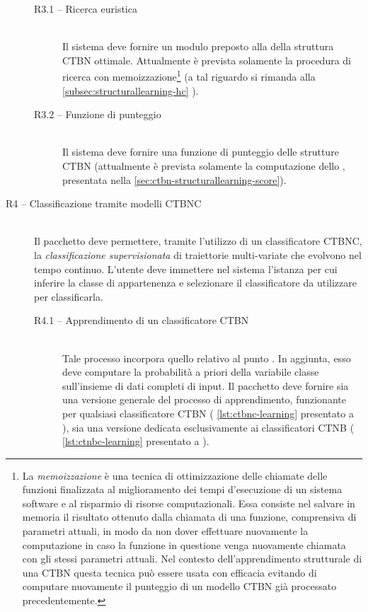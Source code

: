 \begin{description}
		\begin{description}
			\item[R3.1 -- Ricerca euristica] \hfill \\
			Il sistema deve fornire un modulo preposto alla  della struttura \acs{CTBN} ottimale. Attualmente è prevista solamente la procedura di ricerca \emph{\keyword{\hc{}}} con memoizzazione\footnote{La \emph{memoizzazione} è una tecnica di ottimizzazione delle chiamate delle funzioni finalizzata al miglioramento dei tempi d'esecuzione di un sistema software e al risparmio di risorse computazionali. Essa consiste nel salvare in memoria il risultato ottenuto dalla chiamata di una funzione, comprensiva di parametri attuali, in modo da non dover effettuare nuovamente la computazione in caso la funzione in questione venga nuovamente chiamata con gli stessi parametri attuali. Nel contesto dell'apprendimento strutturale di una \acs{CTBN} questa tecnica può essere usata con efficacia evitando di computare nuovamente il punteggio di un modello \acs{CTBN} già processato precedentemente.} (a tal riguardo si rimanda alla \autoref{subsec:structurallearning-hc} ).
			\item[R3.2 -- Funzione di punteggio] \hfill \\
			Il sistema deve fornire una funzione di punteggio delle strutture \acs{CTBN} (attualmente è prevista solamente la computazione dello \emph{}, presentata nella \vref{sec:ctbn-structurallearning-score}).
		\end{description}
	\item[R4 -- Classificazione tramite modelli CTBNC] \hfill \\
	Il pacchetto deve permettere, tramite l'utilizzo di un classificatore \acs{CTBNC}, la \emph{classificazione supervisionata} di traiettorie multi-variate che evolvono nel tempo continuo. L'utente deve immettere nel sistema l'istanza per cui inferire la classe di appartenenza e selezionare il classificatore da utilizzare per classificarla.
		\begin{description}
		\item[R4.1 -- Apprendimento di un classificatore CTBN] \hfill \\
		Tale processo incorpora quello relativo al punto {\bfseries{}}. In aggiunta, esso deve computare la probabilità a priori della variabile classe sull'insieme di dati completi di input. Il pacchetto deve fornire sia una versione generale del processo di apprendimento, funzionante per qualsiasi classificatore \acs{CTBN} (\ie{} \autoref{lst:ctbnc-learning} presentato a ), sia una versione dedicata esclusivamente ai classificatori \acs{CTNB} (\ie{} \autoref{lst:ctnbc-learning} presentato a ).

\end{description}
\end{description}
